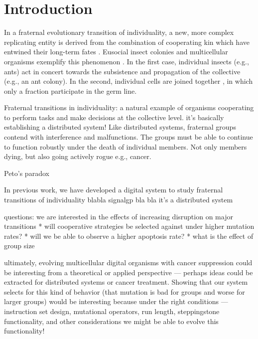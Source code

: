 \section{Introduction}

In a fraternal evolutionary transition of individuality, a new, more complex replicating entity is derived from the combination of cooperating kin which have entwined their long-term fates \citep{west2015major}.
Eusocial insect colonies and multicellular organisms exemplify this phenomenon  \citep{smith1997major}.
In the first case, individual insects (e.g., ants) act in concert towards the subsistence and propagation of the collective (e.g., an ant colony).
In the second, individual cells are joined together , in which only a fraction participate in the germ line.

Fraternal transitions in individuality: a natural example of organisms cooperating to perform tasks and make decisions at the collective level.
it's basically establishing a distributed system!
Like distributed systems, fraternal groups contend with interference and malfunctions.
The groups must be able to continue to function robustly under the death of individual members.
Not only members dying, but also going actively rogue e.g., cancer.

Peto's paradox

In previous work, we have developed a digital system to study fraternal transitions of individuality
blabla
signalgp
bla bla
it's a distributed system

questions:
we are interested in the effects of increasing disruption on major transitions
* will cooperative strategies be selected against under higher mutation rates?
* will we be able to observe a higher apoptosis rate?
* what is the effect of group size


ultimately, evolving multicellular digital organisms with cancer suppression could be interesting from a theoretical or applied perspective --- perhaps ideas could be extracted for distributed systems or cancer treatment.
Showing that our system selects for this kind of behavior (that mutation is bad for groups and worse for larger groups) would be interesting because under the right conditions --- instruction set design, mutational operators, run length, steppingstone functionality, and other considerations we might be able to evolve this functionality!

